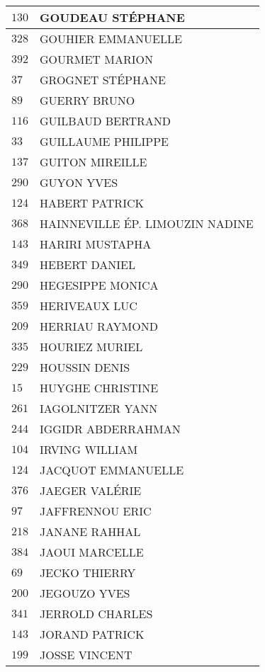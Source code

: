 \begin{xltabular}{\linewidth}{|l|X|}
    \hline
    $130$ & GOUDEAU STÉPHANE \\
    \hline
    $328$ & GOUHIER EMMANUELLE \\
    \hline
    $392$ & GOURMET MARION \\
    \hline
    $37$ & GROGNET STÉPHANE \\
    \hline
    $89$ & GUERRY BRUNO \\
    \hline
    $116$ & GUILBAUD BERTRAND \\
    \hline
    $33$ & GUILLAUME PHILIPPE \\
    \hline
    $137$ & GUITON MIREILLE \\
    \hline
    $290$ & GUYON YVES \\
    \hline
    $124$ & HABERT PATRICK \\
    \hline
    $368$ & HAINNEVILLE ÉP. LIMOUZIN NADINE \\
    \hline
    $143$ & HARIRI MUSTAPHA \\
    \hline
    $349$ & HEBERT DANIEL \\
    \hline
    $290$ & HEGESIPPE MONICA \\
    \hline
    $359$ & HERIVEAUX LUC \\
    \hline
    $209$ & HERRIAU RAYMOND \\
    \hline
    $335$ & HOURIEZ MURIEL \\
    \hline
    $229$ & HOUSSIN DENIS \\
    \hline
    $15$ & HUYGHE CHRISTINE \\
    \hline
    $261$ & IAGOLNITZER YANN \\
    \hline
    $244$ & IGGIDR ABDERRAHMAN \\
    \hline
    $104$ & IRVING WILLIAM \\
    \hline
    $124$ & JACQUOT EMMANUELLE \\
    \hline
    $376$ & JAEGER VALÉRIE \\
    \hline
    $97$ & JAFFRENNOU ERIC \\
    \hline
    $218$ & JANANE RAHHAL \\
    \hline
    $384$ & JAOUI MARCELLE \\
    \hline
    $69$ & JECKO THIERRY \\
    \hline
    $200$ & JEGOUZO YVES \\
    \hline
    $341$ & JERROLD CHARLES \\
    \hline
    $143$ & JORAND PATRICK \\
    \hline
    $199$ & JOSSE VINCENT \\

\end{xltabular}

